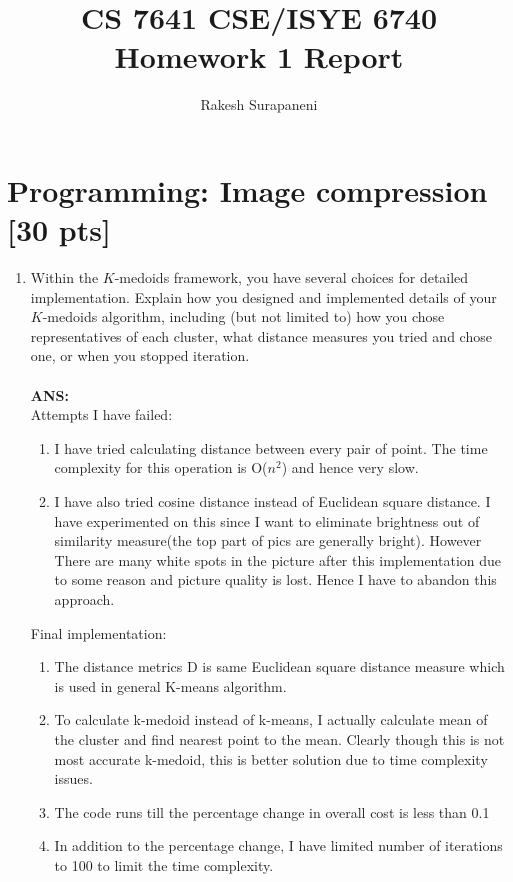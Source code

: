 \documentclass[twoside,10pt]{article}
\begin{document}
\title{CS 7641 CSE/ISYE 6740 Homework 1 Report}
\author{Rakesh Surapaneni}
\maketitle

\section{Programming: Image compression [30 pts]}


\begin{enumerate}
  \item Within the $K$-medoids framework, you have several choices for detailed implementation. Explain how you designed and implemented details of your $K$-medoids algorithm, including (but not limited to) how you chose representatives of each cluster, what distance measures you tried and chose one, or when you stopped iteration.\\
\\
\textbf{ANS:}\\
  Attempts I have failed: 
  \begin{enumerate}
	\item I have tried calculating distance between every pair of point. The time complexity for this operation is O($n^2$) and hence very slow. 
    \item I have also tried cosine distance instead of Euclidean square distance. I have experimented on this since I want to eliminate brightness out of similarity measure(the top part of pics are generally bright). However There are many white spots in the picture after this implementation due to some reason and picture quality is lost. Hence I have to abandon this approach.
  \end{enumerate}
  Final implementation:
  \begin{enumerate}
	\item The distance metrics D is same Euclidean square distance measure which is used in general K-means algorithm. 
    \item To calculate k-medoid instead of k-means, I actually calculate mean of the cluster and find nearest point to the mean. Clearly though this is not most accurate k-medoid, this is better solution due to time complexity issues.
    \item The code runs till the percentage change in overall cost is less than 0.1%
    \item In addition to the percentage change, I have limited number of iterations to 100 to limit the time complexity.
  \end{enumerate}



\end{enumerate}
\end{document}
